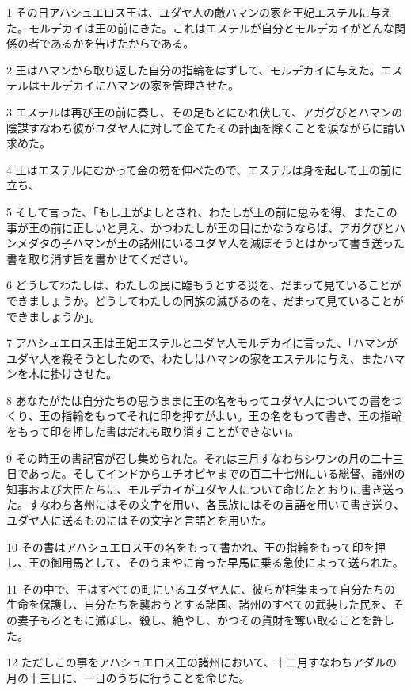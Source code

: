 \par 1 その日アハシュエロス王は、ユダヤ人の敵ハマンの家を王妃エステルに与えた。モルデカイは王の前にきた。これはエステルが自分とモルデカイがどんな関係の者であるかを告げたからである。
\par 2 王はハマンから取り返した自分の指輪をはずして、モルデカイに与えた。エステルはモルデカイにハマンの家を管理させた。
\par 3 エステルは再び王の前に奏し、その足もとにひれ伏して、アガグびとハマンの陰謀すなわち彼がユダヤ人に対して企てたその計画を除くことを涙ながらに請い求めた。
\par 4 王はエステルにむかって金の笏を伸べたので、エステルは身を起して王の前に立ち、
\par 5 そして言った、「もし王がよしとされ、わたしが王の前に恵みを得、またこの事が王の前に正しいと見え、かつわたしが王の目にかなうならば、アガグびとハンメダタの子ハマンが王の諸州にいるユダヤ人を滅ぼそうとはかって書き送った書を取り消す旨を書かせてください。
\par 6 どうしてわたしは、わたしの民に臨もうとする災を、だまって見ていることができましょうか。どうしてわたしの同族の滅びるのを、だまって見ていることができましょうか」。
\par 7 アハシュエロス王は王妃エステルとユダヤ人モルデカイに言った、「ハマンがユダヤ人を殺そうとしたので、わたしはハマンの家をエステルに与え、またハマンを木に掛けさせた。
\par 8 あなたがたは自分たちの思うままに王の名をもってユダヤ人についての書をつくり、王の指輪をもってそれに印を押すがよい。王の名をもって書き、王の指輪をもって印を押した書はだれも取り消すことができない」。
\par 9 その時王の書記官が召し集められた。それは三月すなわちシワンの月の二十三日であった。そしてインドからエチオピヤまでの百二十七州にいる総督、諸州の知事および大臣たちに、モルデカイがユダヤ人について命じたとおりに書き送った。すなわち各州にはその文字を用い、各民族にはその言語を用いて書き送り、ユダヤ人に送るものにはその文字と言語とを用いた。
\par 10 その書はアハシュエロス王の名をもって書かれ、王の指輪をもって印を押し、王の御用馬として、そのうまやに育った早馬に乗る急使によって送られた。
\par 11 その中で、王はすべての町にいるユダヤ人に、彼らが相集まって自分たちの生命を保護し、自分たちを襲おうとする諸国、諸州のすべての武装した民を、その妻子もろともに滅ぼし、殺し、絶やし、かつその貨財を奪い取ることを許した。
\par 12 ただしこの事をアハシュエロス王の諸州において、十二月すなわちアダルの月の十三日に、一日のうちに行うことを命じた。
